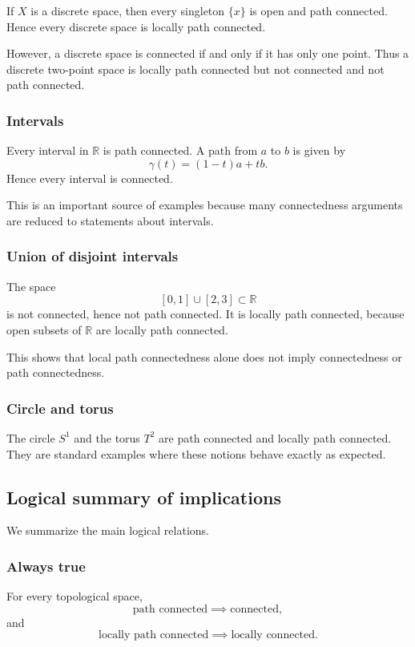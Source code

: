 \documentclass[12pt,a4paper]{article}
\theoremstyle{notespace}
\begin{document}
If \(X\) is a discrete space, then every singleton \(\{x\}\) is open and path connected. Hence every discrete space is locally path connected.

However, a discrete space is connected if and only if it has only one point. Thus a discrete two-point space is locally path connected but not connected and not path connected.

\subsubsection{Intervals}

Every interval in \(\mathbb{R}\) is path connected. A path from \(a\) to \(b\) is given by
\[
\gamma(t)=(1-t)a+tb.
\]
Hence every interval is connected.

This is an important source of examples because many connectedness arguments are reduced to statements about intervals.

\subsubsection{Union of disjoint intervals}

The space
\[
[0,1]\cup [2,3]\subset \mathbb{R}
\]
is not connected, hence not path connected. It is locally path connected, because open subsets of \(\mathbb{R}\) are locally path connected.

This shows that local path connectedness alone does not imply connectedness or path connectedness.

\subsubsection{Circle and torus}

The circle \(S^1\) and the torus \(T^2\) are path connected and locally path connected. They are standard examples where these notions behave exactly as expected.

\subsection{Logical summary of implications}

We summarize the main logical relations.

\subsubsection{Always true}

For every topological space,
\[
\text{path connected} \implies \text{connected},
\]
and
\[
\text{locally path connected} \implies \text{locally connected}.
\]
\end{document}
